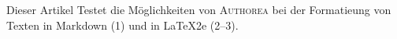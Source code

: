 Dieser Artikel Testet die Möglichkeiten von \textsc{Authorea} bei der Formatieung von Texten in Markdown (1) und in \LaTeX2e (2–3).
